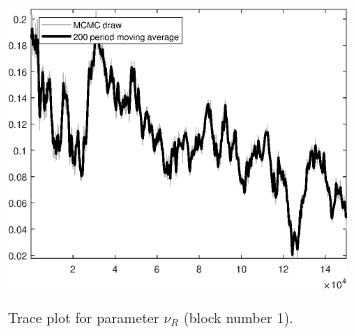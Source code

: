 \begin{figure}[H]
\centering
  \includegraphics[width=0.8\textwidth]{BRS_sectoral_KK/graphs/TracePlot_nu_R_blck_1}\\
    \caption{Trace plot for parameter ${\nu_R}$ (block number 1).}
\end{figure}

